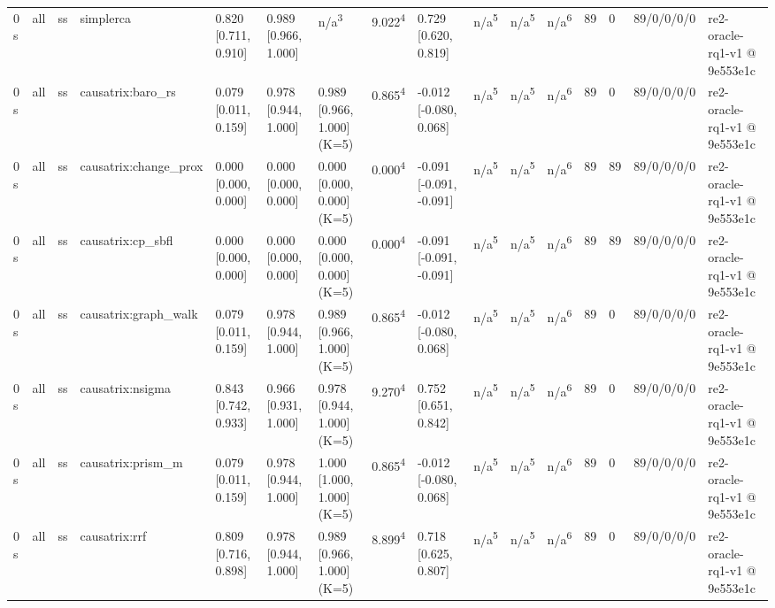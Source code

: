 \begin{table}[t]
\begin{tabular}{llllllllllllllll}
0 s & all & ss & simplerca & 0.820 [0.711, 0.910] & 0.989 [0.966, 1.000] & n/a\textsuperscript{3} & 9.022\textsuperscript{4} & 0.729 [0.620, 0.819] & n/a\textsuperscript{5} & n/a\textsuperscript{5} & n/a\textsuperscript{6} & 89 & 0 & 89/0/0/0/0 & re2-oracle-rq1-v1 @ 9e553e1c \\
0 s & all & ss & causatrix:baro\_rs & 0.079 [0.011, 0.159] & 0.978 [0.944, 1.000] & 0.989 [0.966, 1.000] (K=5) & 0.865\textsuperscript{4} & -0.012 [-0.080, 0.068] & n/a\textsuperscript{5} & n/a\textsuperscript{5} & n/a\textsuperscript{6} & 89 & 0 & 89/0/0/0/0 & re2-oracle-rq1-v1 @ 9e553e1c \\
0 s & all & ss & causatrix:change\_prox & 0.000 [0.000, 0.000] & 0.000 [0.000, 0.000] & 0.000 [0.000, 0.000] (K=5) & 0.000\textsuperscript{4} & -0.091 [-0.091, -0.091] & n/a\textsuperscript{5} & n/a\textsuperscript{5} & n/a\textsuperscript{6} & 89 & 89 & 89/0/0/0/0 & re2-oracle-rq1-v1 @ 9e553e1c \\
0 s & all & ss & causatrix:cp\_sbfl & 0.000 [0.000, 0.000] & 0.000 [0.000, 0.000] & 0.000 [0.000, 0.000] (K=5) & 0.000\textsuperscript{4} & -0.091 [-0.091, -0.091] & n/a\textsuperscript{5} & n/a\textsuperscript{5} & n/a\textsuperscript{6} & 89 & 89 & 89/0/0/0/0 & re2-oracle-rq1-v1 @ 9e553e1c \\
0 s & all & ss & causatrix:graph\_walk & 0.079 [0.011, 0.159] & 0.978 [0.944, 1.000] & 0.989 [0.966, 1.000] (K=5) & 0.865\textsuperscript{4} & -0.012 [-0.080, 0.068] & n/a\textsuperscript{5} & n/a\textsuperscript{5} & n/a\textsuperscript{6} & 89 & 0 & 89/0/0/0/0 & re2-oracle-rq1-v1 @ 9e553e1c \\
0 s & all & ss & causatrix:nsigma & 0.843 [0.742, 0.933] & 0.966 [0.931, 1.000] & 0.978 [0.944, 1.000] (K=5) & 9.270\textsuperscript{4} & 0.752 [0.651, 0.842] & n/a\textsuperscript{5} & n/a\textsuperscript{5} & n/a\textsuperscript{6} & 89 & 0 & 89/0/0/0/0 & re2-oracle-rq1-v1 @ 9e553e1c \\
0 s & all & ss & causatrix:prism\_m & 0.079 [0.011, 0.159] & 0.978 [0.944, 1.000] & 1.000 [1.000, 1.000] (K=5) & 0.865\textsuperscript{4} & -0.012 [-0.080, 0.068] & n/a\textsuperscript{5} & n/a\textsuperscript{5} & n/a\textsuperscript{6} & 89 & 0 & 89/0/0/0/0 & re2-oracle-rq1-v1 @ 9e553e1c \\
0 s & all & ss & causatrix:rrf & 0.809 [0.716, 0.898] & 0.978 [0.944, 1.000] & 0.989 [0.966, 1.000] (K=5) & 8.899\textsuperscript{4} & 0.718 [0.625, 0.807] & n/a\textsuperscript{5} & n/a\textsuperscript{5} & n/a\textsuperscript{6} & 89 & 0 & 89/0/0/0/0 & re2-oracle-rq1-v1 @ 9e553e1c \\

\end{tabular}
\end{table}
